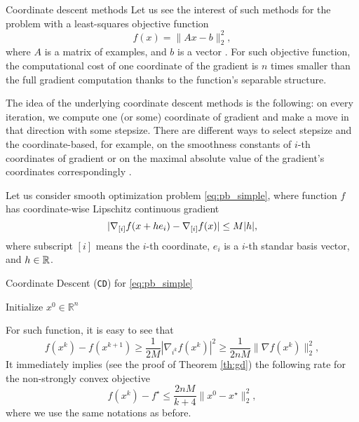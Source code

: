 Coordinate descent methods  Let us see the interest of such methods for the problem with a least-squares objective function
$$
f(x) = \|Ax-b\|_2^2,
$$
where $A$ is a matrix of examples, and $b$ is a vector . For such objective function, the computational cost of one coordinate of the gradient is $n$ times smaller than the full gradient computation thanks to the function's separable structure.

The idea of the underlying coordinate descent methods is the following: on every iteration, we compute one (or some) coordinate of gradient and make a move in that direction with some stepsize. There are different ways to select stepsize and the coordinate-based, for example, on the smoothness constants of $i$-th coordinates of gradient \cite{richtarik2012efficient} or on the maximal absolute value of the gradient's coordinates correspondingly \cite{nesterov2012efficiency}. 

Let us consider smooth optimization problem \eqref{eq:pb_simple}, where function $f$ has coordinate-wise Lipschitz continuous gradient
\begin{equation}\label{eq:lipsch_coord}
|\nabla_{[i]} f(x+{h}e_i) - \nabla_{[i]} f(x)|\leq M|h|,
\end{equation}
where subscript $[i]$ means the $i$-th coordinate, $e_i$ is a $i$-th standar basis vector, and $h\in\mathbb{R}$.
\begin{algorithm}
    \caption{Coordinate Descent (\texttt{CD}) for \eqref{eq:pb_simple}}
    \label{algo:cd}
    \begin{algorithmic}
        \STATE Initialize $x^0\in\mathbb{R}^n$
        \ENDFOR
    \end{algorithmic}
\end{algorithm}
For such function, it is easy to see that
$$
f(x^{k}) - f(x^{k+1})\geq \frac{1}{2M}|\nabla_{i^k} f(x^k)|^2\geq \frac{1}{2nM}\|\nabla f(x^k)\|_2^2,
$$
It immediately implies (see the proof of Theorem \ref{th:gd}) the following rate for the non-strongly convex objective
$$
f(x^k) - f^\star\leq \frac{2nM}{k+4}\|x^0-x^\star\|_2^2,
$$
where we use the same notations as before. 

